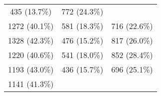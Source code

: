 \documentclass[10pt,]{article}
\begin{document}
\begin{longtable}[c]{@{}ccc@{}}
\begin{minipage}[t]{0.22\columnwidth}
435 (13.7\%)
\strut\end{minipage} &
\begin{minipage}[t]{0.38\columnwidth}\centering\strut
772 (24.3\%)
\strut\end{minipage}\tabularnewline
\begin{minipage}[t]{0.23\columnwidth}\centering\strut
1272 (40.1\%)
\strut\end{minipage} &
\begin{minipage}[t]{0.22\columnwidth}\centering\strut
581 (18.3\%)
\strut\end{minipage} &
\begin{minipage}[t]{0.38\columnwidth}\centering\strut
716 (22.6\%)
\strut\end{minipage}\tabularnewline
\begin{minipage}[t]{0.23\columnwidth}\centering\strut
1328 (42.3\%)
\strut\end{minipage} &
\begin{minipage}[t]{0.22\columnwidth}\centering\strut
476 (15.2\%)
\strut\end{minipage} &
\begin{minipage}[t]{0.38\columnwidth}\centering\strut
817 (26.0\%)
\strut\end{minipage}\tabularnewline
\begin{minipage}[t]{0.23\columnwidth}\centering\strut
1220 (40.6\%)
\strut\end{minipage} &
\begin{minipage}[t]{0.22\columnwidth}\centering\strut
541 (18.0\%)
\strut\end{minipage} &
\begin{minipage}[t]{0.38\columnwidth}\centering\strut
852 (28.4\%)
\strut\end{minipage}\tabularnewline
\begin{minipage}[t]{0.23\columnwidth}\centering\strut
1193 (43.0\%)
\strut\end{minipage} &
\begin{minipage}[t]{0.22\columnwidth}\centering\strut
436 (15.7\%)
\strut\end{minipage} &
\begin{minipage}[t]{0.38\columnwidth}\centering\strut
696 (25.1\%)
\strut\end{minipage}\tabularnewline
\begin{minipage}[t]{0.23\columnwidth}\centering\strut
1141 (41.3\%)
\strut\end{minipage} &
\begin{minipage}[t]{0.22\columnwidth}\centering\strut

\end{minipage}
\end{longtable}
\end{document}
